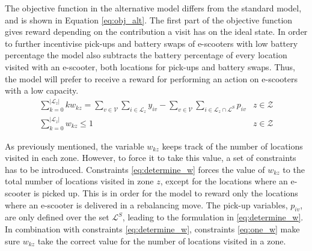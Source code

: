 The objective function in the alternative model differs from the standard model, and is shown in Equation \eqref{eq:obj_alt}. The first part of the objective function gives reward depending on the contribution a visit has on the ideal state. In order to further incentivise pick-ups and battery swaps of e-scooters with low battery percentage the model also subtracts the battery percentage of every location visited with an e-scooter, both locations for pick-ups and battery swaps. Thus, the model will prefer to receive a reward for performing an action on e-scooters with a low capacity. 
\begin{eqnarray}
    \displaystyle\sum_{k=0}^{|\mathcal{L}_z|}kw_{kz} = \displaystyle\sum_{v\in \mathcal{V}} \displaystyle\sum_{i \in \mathcal{L}_{z}} y_{iv} -  \displaystyle\sum_{v\in \mathcal{V}} \displaystyle\sum_{i \in \mathcal{L}_{z} \cap \mathcal{L}^{S}} p_{iv} & z \in \mathcal{Z}\label{eq:determine_w} \\
    \displaystyle\sum_{k=0}^{|\mathcal{L}_z|}w_{kz} \leq 1 & z \in \mathcal{Z}\label{eq:one_w}
\end{eqnarray}

As previously mentioned, the variable $w_{kz}$ keeps track of the number of locations visited in each zone. However, to force it to take this value, a set of constraints has to be introduced. Constraints \eqref{eq:determine_w} forces the value of $w_{kz}$ to the total number of locations visited in zone $z$, except for the locations where an e-scooter is picked up. This is in order for the model to reward only the locations where an e-scooter is delivered in a rebalancing move. The pick-up variables, $p_{iv}$, are only defined over the set $\mathcal{L}^{S}$, leading to the formulation in \eqref{eq:determine_w}. In combination with constraints \eqref{eq:determine_w}, constraints \eqref{eq:one_w} make sure $w_{kz}$ take the correct value for the number of locations visited in a zone.





